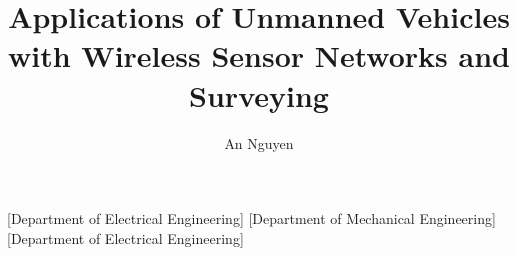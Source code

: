 \documentclass[12pt]{report}
\begin{document}
\chapternumberfont{\fontsize{16}{20}\selectfont}
\chaptertitlefont{\centering\fontsize{16}{20}\selectfont}
\sectionfont{\fontsize{14}{16}\selectfont}
\subsectionfont{\fontsize{12}{14}\selectfont}

\title{Applications of Unmanned Vehicles with Wireless Sensor Networks and Surveying} %
\author{An Nguyen}


[Department of Electrical Engineering]
[Department of Mechanical Engineering]
[Department of Electrical Engineering]

\copyrighttrue
{}

\dissertationfalse

%
\makecoverpages

%
\begin{acknowledgements}

\end{acknowledgements}
\end{document}
